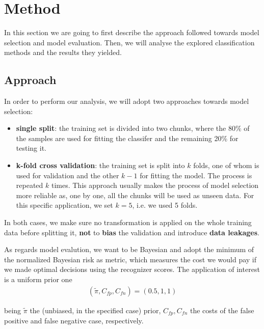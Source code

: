 \section{Method}
In this section we are going to first describe the approach followed towards model selection and model evaluation. Then, we will analyse the explored classification methods and the results they yielded.
 
\subsection{Approach}
In order to perform our analysis, we will adopt two approaches towards model selection:
\begin{itemize}
	\item \textbf{single split}: the training set is divided into two chunks, where the 80\% of the samples are used for fitting the classifer and the remaining 20\% for testing it. 
	\item \textbf{k-fold cross validation}: the training set is split into $k$ folds, one of whom is used for validation and the other $k - 1$ for fitting the model. The process is repeated $k$ times. This approach usually makes the process of model selection more reliable as, one by one, all the chunks will be used as unseen data. 
	For this specific application, we set $k = 5$, i.e. we used 5 folds. 
	
\end{itemize}
In both cases, we make sure no transformation is applied on the whole training data before splitting it, \textbf{not} to \textbf{bias} the validation and introduce \textbf{data leakages}.  

As regards model evalution, we want to be Bayesian and adopt the minimum of the normalized Bayesian risk as metric, which measures the cost we would pay if we made optimal decisions using the recognizer scores. The application of interest is a uniform prior one
\begin{align*}
	(\tilde{\pi}, C_{fp}, C_{fn}) = (0.5, 1, 1)
\end{align*}

being $\tilde{\pi}$ the (unbiased, in the specified case) prior, $C_{fp}, C_{fn}$ the costs of the false positive and false negative case, respectively.


